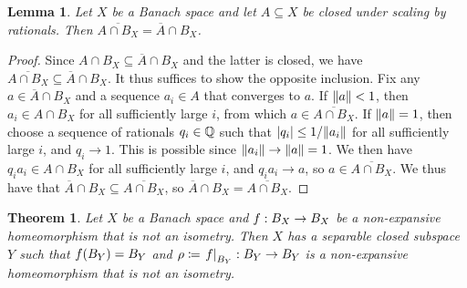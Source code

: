 \documentclass{amsart}
\newtheorem{theorem}{Theorem}
\newtheorem{lemma}{Lemma}
\newcommand{\clo}[1]{\overline{#1}}
\begin{document}
\begin{lemma}
    Let $X$ be a Banach space and let $A \subseteq X$ be closed under scaling by rationals. Then $\clo{A \cap B_X} = \clo{A} \cap B_X$.
\end{lemma}

\begin{proof}
Since $A \cap B_X \subseteq \clo{A} \cap B_X$ and the latter is closed, we
have $\clo{A \cap B_X} \subseteq \clo{A} \cap B_X$. It thus suffices to show
the opposite inclusion. Fix any $a \in \clo{A} \cap B_X$ and a sequence $a_i
\in A$ that converges to $a$. If $\norm{a} < 1$, then $a_i \in A \cap B_X$ for
all sufficiently large $i$, from which $a \in \clo{A \cap B_X}$. If $\norm{a} =
1$, then choose a sequence of rationals $q_i \in \mathbb{Q}$ such that $\abs{q_i} \leq 1/
\norm{a_i}$ for all sufficiently large $i$, and $q_i \to 1$. This is possible
since $\norm{a_i} \to \norm{a} = 1$. We then have $q_i a_i \in A \cap B_X$ for all
sufficiently large $i$, and $q_i a_i \to a$, so $a \in \clo{A \cap B_X}$. We thus
have that $\clo{A} \cap B_X \subseteq \clo{A \cap B_X}$, so $\clo{A} \cap B_X =
\clo{A \cap B_X}$.
\end{proof}

\newcommand\restr[2]{\ensuremath{\left.#1\right|_{#2}}}

\begin{theorem}
    Let $X$ be a Banach space and $f: B_X \to B_X$ be a non-expansive homeomorphism that is not an isometry. Then $X$ has a separable closed subspace $Y$ such that $f(B_Y) = B_Y$ and $\rho \coloneqq \restr{\lip}{B_Y} : B_Y \to B_Y$ is a non-expansive homeomorphism that is not an isometry.
\end{theorem}
\end{document}

